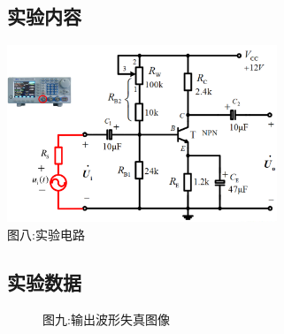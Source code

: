 \documentclass[a4paper]{article}
\begin{document}
    \subsection{实验内容}\label{subsec:18}
    \begin{center}
        \includegraphics[height=150pt]{exp5}\\
        {\small 图八:实验电路}
    \end{center}

    \subsection{实验数据}\label{subsec:19}
    \begin{figure}[htb]
        \centering
        {\small 图九:输出波形失真图像}
    \end{figure}
\end{document}
